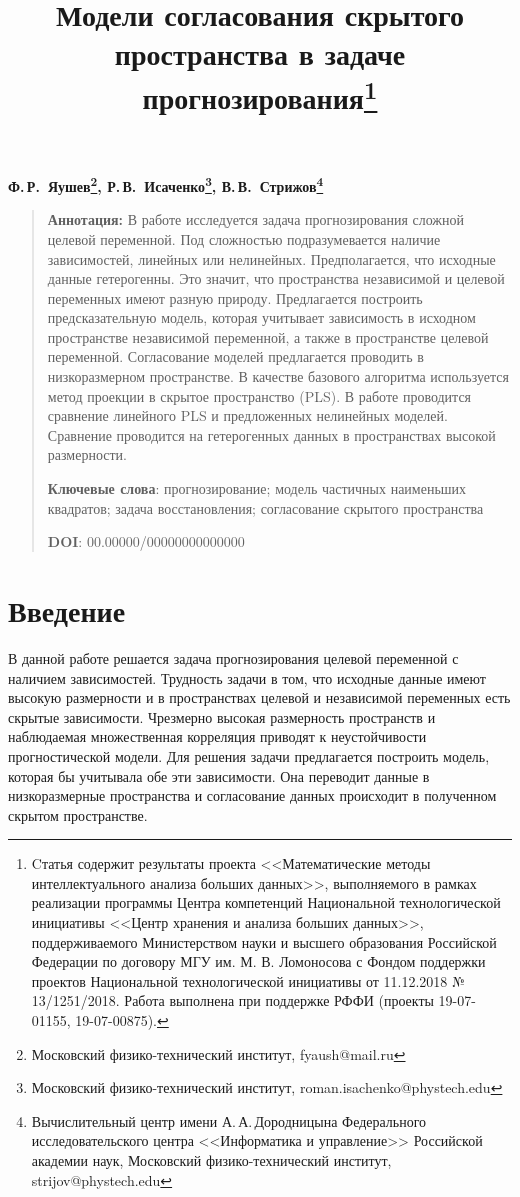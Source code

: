 \documentclass[12pt]{article}
\begin{document}
\title{Модели согласования скрытого пространства в задаче прогнозирования\thanks{Cтатья содержит результаты проекта <<Математические  методы интеллектуального анализа больших данных>>, выполняемого в рамках реализации программы Центра компетенций Национальной технологической инициативы <<Центр хранения и анализа больших данных>>, поддерживаемого Министерством науки и высшего образования Российской Федерации по договору МГУ им. М. В. Ломоносова с Фондом поддержки проектов Национальной технологической инициативы от 11.12.2018 № 13/1251/2018. Работа выполнена при поддержке РФФИ (проекты 19-07-01155, 19-07-00875).}}
\date{}
\author{}
\maketitle

\begin{center}
\bf
Ф.\,Р.~Яушев\footnote{Московский физико-технический институт, fyaush@mail.ru}, 
Р.\,В.~Исаченко\footnote{Московский физико-технический институт, roman.isachenko@phystech.edu}, 
В.\,В.~Стрижов\footnote{Вычислительный центр имени А.\,А.\,Дородницына Федерального исследовательского центра <<Информатика и управление>> Российской академии наук, Московский физико-технический институт, strijov@phystech.edu}
\end{center}
{\begin{quote}
\textbf{Аннотация:}
В работе исследуется задача прогнозирования сложной целевой переменной. 
Под сложностью подразумевается наличие зависимостей, линейных или нелинейных. Предполагается, что исходные данные гетерогенны. Это значит, что пространства независимой и целевой переменных имеют разную природу. Предлагается построить предсказательную модель, которая учитывает зависимость в исходном пространстве независимой переменной, а также в пространстве целевой переменной. Согласование моделей предлагается проводить в низкоразмерном пространстве. В качестве базового алгоритма используется метод проекции в скрытое пространство (PLS). В работе проводится сравнение линейного PLS и предложенных нелинейных моделей. Сравнение проводится на гетерогенных данных в пространствах высокой размерности.

\smallskip
\textbf{Ключевые слова}: прогнозирование; модель частичных наименьших квадратов; задача восстановления; согласование скрытого пространства
\smallskip

\textbf{DOI}: 00.00000/00000000000000
\end{quote}
}


\section{Введение}
В данной работе решается задача прогнозирования целевой переменной с наличием зависимостей. Трудность задачи в том, что исходные данные имеют высокую размерности и в пространствах целевой и независимой переменных есть скрытые зависимости. Чрезмерно высокая размерность пространств и наблюдаемая множественная корреляция приводят к неустойчивости прогностической модели. Для решения задачи предлагается построить модель, которая бы учитывала обе эти зависимости. Она переводит данные в низкоразмерные пространства и согласование данных происходит в полученном скрытом пространстве.
\end{document}
